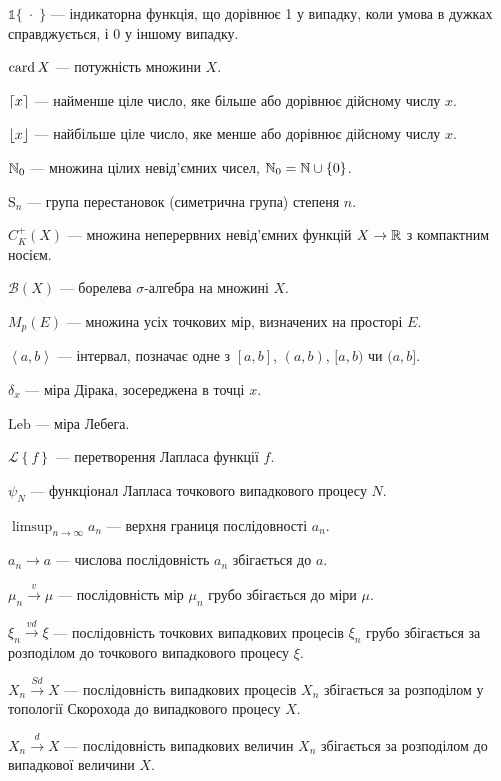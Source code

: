 $\mathds{1}\{\; \cdot\;\}$ --- індикаторна функція, що дорівнює 1 у випадку, коли умова в
дужках справджується, і 0 у іншому випадку.

$\card X$ --- потужність множини $X$. 

$\ceil*{x}$ --- найменше ціле число, яке більше або дорівнює дійсному числу $x$.%

$\floor*{x}$ --- найбільше ціле число, яке менше або дорівнює дійсному числу $x$.%

$\N_0$ --- множина цілих невід'ємних чисел, $\N_0 = \N \cup \{0\}$.

$\mathrm{S}_n$ --- група перестановок (симетрична група) степеня $n$.

$C_K^+(X)$ --- множина неперервних невід'ємних функцій
$X \to \R$ з компактним носієм.

$\mathcal{B}(X)$ --- борелева $\sigma$-алгебра на множині $X$.

$M_p(E)$ --- множина усіх точкових мір, визначених на просторі $E$.

$\left<a,b\right>$ --- інтервал, позначає одне з $[a, b]$, $(a, b)$, $[a, b)$ чи $(a, b]$.

$\delta_x$ --- міра Дірака, зосереджена в точці $x$.

$\mathrm{Leb}$ --- міра Лебега.

$\mathcal{L}\left\{f\right\}$ --- перетворення Лапласа функції $f$.

$\psi_N$ --- функціонал Лапласа точкового випадкового процесу $N$.

$\limsup_{n\to\infty} a_n$ --- верхня границя послідовності $a_n$.

$a_n \to a$ --- числова послідовність $a_n$ збігається до $a$.

$\mu_n \overset{v}{\longrightarrow} \mu$ --- послідовність мір $\mu_n$
грубо збігається до міри $\mu$.

$\xi_n \overset{vd}{\longrightarrow} \xi$ --- послідовність точкових випадкових процесів $\xi_n$
грубо збігається за розподілом до точкового випадкового процесу $\xi$.

$X_n \overset{Sd}{\longrightarrow} X$ --- послідовність випадкових процесів $X_n$
збігається за розподілом у топології Скорохода до випадкового процесу $X$.

$X_n \overset{d}{\longrightarrow} X$ --- послідовність випадкових величин $X_n$
збігається за розподілом до випадкової величини $X$.

